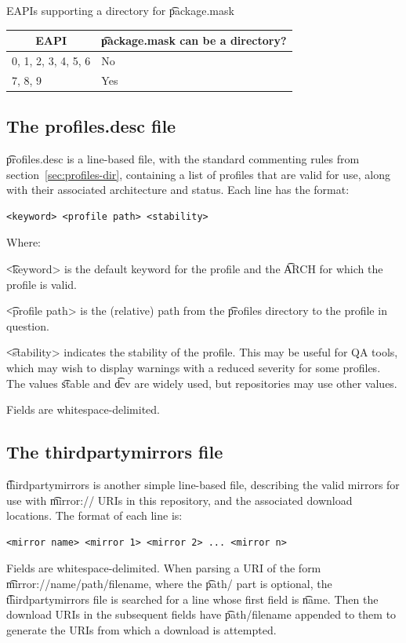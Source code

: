 \begin{centertable}{EAPIs supporting a directory for \t{package.mask}}
    \label{tab:package-mask-dir}
    \begin{tabular}{ll}
      \toprule
      \multicolumn{1}{c}{\textbf{EAPI}} &
      \multicolumn{1}{c}{\textbf{\t{package.mask} can be a directory?}} \\
      \midrule
      0, 1, 2, 3, 4, 5, 6 & No  \\
      7, 8, 9             & Yes \\
      \bottomrule
    \end{tabular}
\end{centertable}

\subsection{The profiles.desc file}
\label{sec:profiles.desc}
\t{profiles.desc} is a line-based file, with the standard commenting
rules from section~\ref{sec:profiles-dir}, containing a list of profiles
that are valid for use, along with their associated architecture and
status. Each line has the format:

\begin{verbatim}
<keyword> <profile path> <stability>
\end{verbatim}

Where:
\nobreakpar
\begin{compactitem}
\item \t{<keyword>} is the default keyword for the profile and the \t{ARCH} for which the profile is
    valid.
\item \t{<profile path>} is the (relative) path from the \t{profiles} directory to the profile in
    question.
\item \t{<stability>} indicates the stability of the profile. This may be useful for QA tools, which
    may wish to display warnings with a reduced severity for some profiles. The values \t{stable}
    and \t{dev} are widely used, but repositories may use other values.
\end{compactitem}

Fields are whitespace-delimited.

\subsection{The thirdpartymirrors file}
\label{sec:thirdpartymirrors}
\t{thirdpartymirrors} is another simple line-based file, describing the valid mirrors for use with
\t{mirror://} URIs in this repository, and the associated download locations. The format of each
line is:
\begin{verbatim}
<mirror name> <mirror 1> <mirror 2> ... <mirror n>
\end{verbatim}
Fields are whitespace-delimited. When parsing a URI of the form
\t{mirror:/\slash name\slash path\slash filename},
where the \t{path/} part is optional, the \t{thirdpartymirrors} file is searched for a line whose
first field is \t{name}. Then the download URIs in the subsequent fields have
\t{path\slash filename} appended to them to generate the URIs from which a download is attempted.

